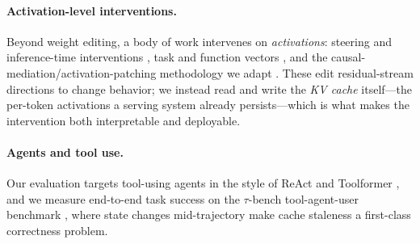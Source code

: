 \paragraph{Activation-level interventions.} Beyond weight editing, a body of work intervenes on
\emph{activations}: steering and inference-time interventions \citep{li2023iti}, task and function vectors
\citep{ilharco2023taskvectors,todd2024functionvectors}, and the causal-mediation/activation-patching
methodology we adapt \citep{vig2020causal}. These edit residual-stream directions to change behavior; we
instead read and write the \emph{KV cache} itself---the per-token activations a serving system already
persists---which is what makes the intervention both interpretable and deployable.

\paragraph{Agents and tool use.} Our evaluation targets tool-using agents in the style of ReAct
\citep{yao2023react} and Toolformer \citep{schick2023toolformer}, and we measure end-to-end task success on
the $\tau$-bench tool-agent-user benchmark \citep{yao2024taubench}, where state changes mid-trajectory make
cache staleness a first-class correctness problem.
